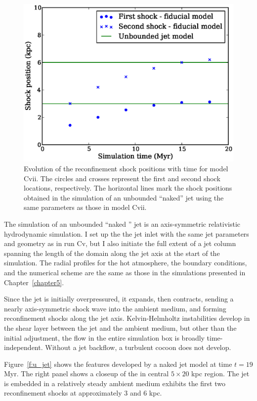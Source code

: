 \begin{figure}
\includegraphics[width=\linewidth]{nse.eps}
\caption{Evolution of the reconfinement shock positions with time for model Cvii. The circles and crosses represent the first and second shock locations, respectively. The horizontal lines mark the shock positions obtained in the simulation of an unbounded ``naked'' jet using the same parameters as those in model Cvii.}
\label{f:c_vs_n}
\end{figure}



The simulation of an unbounded ``naked '' jet is an axis-symmetric relativistic hydrodynamic simulation.  I set up the the jet inlet with the same jet parameters and geometry as in run Cv, but I also initiate the full extent of a jet column spanning the length of the domain along the jet axis at the start of the simulation. The radial profiles for the hot atmosphere, the boundary conditions, and the numerical scheme are the same as those in the simulations presented in Chapter~\ref{chapter5}.

Since the jet is initially overpressured, it expands, then contracts, sending a nearly axis-symmetric shock wave into the ambient medium, and forming reconfinement shocks along the jet axis. Kelvin-Helmholtz instabilities develop in the shear layer between the jet and the ambient medium, but other than the initial adjustment, the flow in the entire simulation box is broadly time-independent. Without a jet backflow, a turbulent cocoon does not develop.

Figure~\ref{f:u_jet} shows the features developed by a naked jet model at time $t=19$ Myr. The right panel shows a closeup of the in central $5\times20$ kpc region. The jet is embedded in a relatively steady ambient medium exhibits the first two reconfinement shocks at approximately 3 and 6 kpc.

